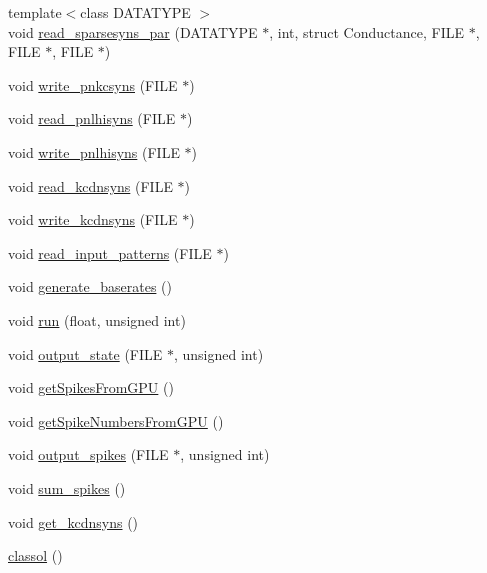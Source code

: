 \begin{DoxyCompactItemize}
\item 
{\footnotesize template$<$class D\+A\+T\+A\+T\+Y\+P\+E $>$ }\\void \hyperlink{classclassol_a978cae14cbba95f29619c0aacba7ffbe}{read\+\_\+sparsesyns\+\_\+par} (D\+A\+T\+A\+T\+Y\+P\+E $\ast$, int, struct Conductance, F\+I\+L\+E $\ast$, F\+I\+L\+E $\ast$, F\+I\+L\+E $\ast$)
\item 
void \hyperlink{classclassol_a272983bc77c8c547310a38fd340c29e4}{write\+\_\+pnkcsyns} (F\+I\+L\+E $\ast$)
\item 
void \hyperlink{classclassol_a135ee4ab60d3afa11c5cba74d362fbe6}{read\+\_\+pnlhisyns} (F\+I\+L\+E $\ast$)
\item 
void \hyperlink{classclassol_a661def594f59444eac7a0a08e599ec07}{write\+\_\+pnlhisyns} (F\+I\+L\+E $\ast$)
\item 
void \hyperlink{classclassol_a5530acb74e884fe7b802e2e6eaec9c3a}{read\+\_\+kcdnsyns} (F\+I\+L\+E $\ast$)
\item 
void \hyperlink{classclassol_ad409b77aceb2136bbc069b1ec55d7998}{write\+\_\+kcdnsyns} (F\+I\+L\+E $\ast$)
\item 
void \hyperlink{classclassol_a554e027fafa47fbf9ee68e9e5bd91de2}{read\+\_\+input\+\_\+patterns} (F\+I\+L\+E $\ast$)
\item 
void \hyperlink{classclassol_a4e4e5bee0655e84dfee6e98e6a75dc3b}{generate\+\_\+baserates} ()
\item 
void \hyperlink{classclassol_ae907498a8660fe41f7d9b41aad6e5d10}{run} (float, unsigned int)
\item 
void \hyperlink{classclassol_a88179d17f4ea568b7b58a329a741eb53}{output\+\_\+state} (F\+I\+L\+E $\ast$, unsigned int)
\item 
void \hyperlink{classclassol_ae571e028c069103e19bb4975bdb0dd47}{get\+Spikes\+From\+G\+P\+U} ()
\item 
void \hyperlink{classclassol_a08d82fc16288158062aef866a1e29a65}{get\+Spike\+Numbers\+From\+G\+P\+U} ()
\item 
void \hyperlink{classclassol_a54d61e7df53d16d7b8e1de46bcca6c6c}{output\+\_\+spikes} (F\+I\+L\+E $\ast$, unsigned int)
\item 
void \hyperlink{classclassol_af9dfaa92f0e4737dbadd9ec9cd203555}{sum\+\_\+spikes} ()
\item 
void \hyperlink{classclassol_af4700403ad71ef8d07c67883ad914f75}{get\+\_\+kcdnsyns} ()
\item 
\hyperlink{classclassol_a0f4a2bbdd48bcdfcc2abaa58a839232c}{classol} ()
\item 

\end{DoxyCompactItemize}
